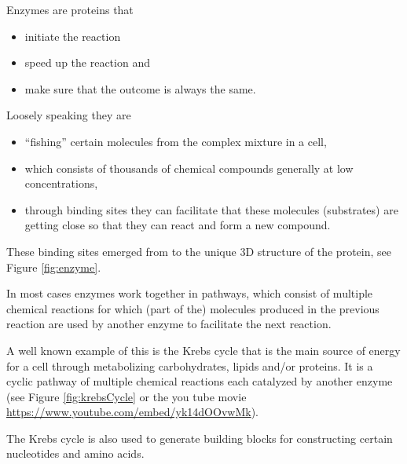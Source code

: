 \documentclass[
  11pt,
]{book}
\providecommand{\tightlist}{%
  \setlength{\itemsep}{0pt}\setlength{\parskip}{0pt}}
\begin{document}
Enzymes are proteins that

\begin{itemize}
\tightlist
\item
  initiate the reaction
\item
  speed up the reaction and
\item
  make sure that the outcome is always the same.
\end{itemize}

Loosely speaking they are

\begin{itemize}
\tightlist
\item
  ``fishing'' certain molecules from the complex mixture in a cell,
\item
  which consists of thousands of chemical compounds generally at low concentrations,
\item
  through binding sites they can facilitate that these molecules (substrates) are getting close so that they can react and form a new compound.
\end{itemize}

These binding sites emerged from to the unique 3D structure of the protein, see Figure \ref{fig:enzyme}.

In most cases enzymes work together in pathways, which consist of multiple chemical reactions for which (part of the) molecules produced in the previous reaction are used by another enzyme to facilitate the next reaction.

A well known example of this is the Krebs cycle that is the main source of energy for a cell through metabolizing carbohydrates, lipids and/or proteins. It is a cyclic pathway of multiple chemical reactions each catalyzed by another enzyme (see Figure \ref{fig:krebsCycle} or the you tube movie \url{https://www.youtube.com/embed/yk14dOOvwMk}).

The Krebs cycle is also used to generate building blocks for constructing certain nucleotides and amino acids.
\end{document}
